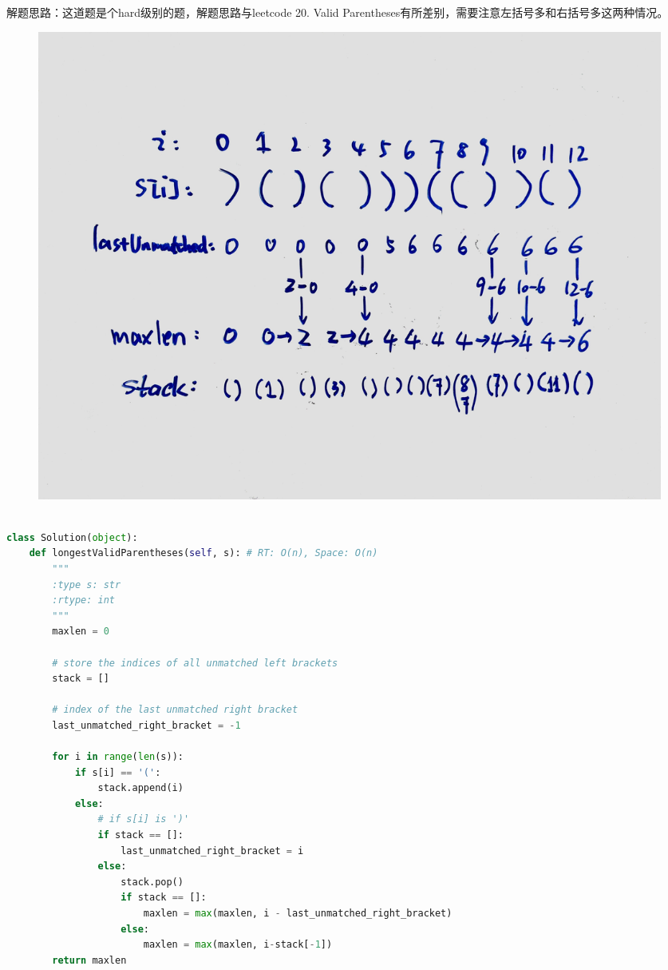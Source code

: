 \documentclass[a4paper,10pt]{article}
\begin{document}
\begin{CJK*}{UTF8}{gbsn}
\noindent 解题思路：这道题是个hard级别的题，解题思路与leetcode 20. Valid Parentheses有所差别，需要注意左括号多和右括号多这两种情况。
\end{CJK*}

\begin{figure}[h]
    \includegraphics[width=\textwidth]{leetcode32.jpg}
    \centering \\
\end{figure}

\begin{lstlisting}[language=Python, caption=Problem32. Longest Valid Parentheses]

class Solution(object):
    def longestValidParentheses(self, s): # RT: O(n), Space: O(n)
        """
        :type s: str
        :rtype: int
        """
        maxlen = 0

        # store the indices of all unmatched left brackets
        stack = []

        # index of the last unmatched right bracket
        last_unmatched_right_bracket = -1

        for i in range(len(s)):
            if s[i] == '(':
                stack.append(i)
            else:
                # if s[i] is ')'
                if stack == []:
                    last_unmatched_right_bracket = i
                else:
                    stack.pop()
                    if stack == []:
                        maxlen = max(maxlen, i - last_unmatched_right_bracket)
                    else:
                        maxlen = max(maxlen, i-stack[-1])
        return maxlen
\end{lstlisting}
\end{document}

